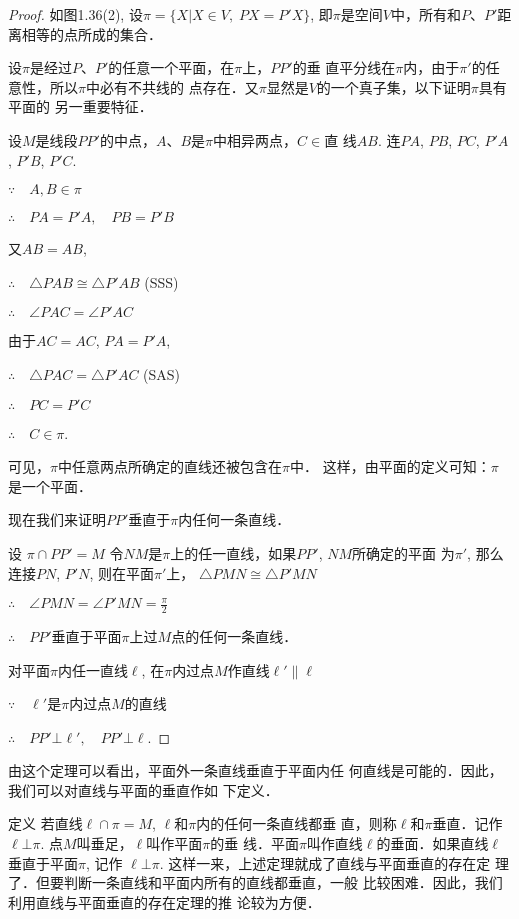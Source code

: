 \begin{proof}
如图1.36(2), 设$\pi=\{X|X\in V,\; PX=P'X\}$, 
即$\pi$是空间$V$中，所有和$P$、$P'$距离相等的点所成的集合．

设$\pi$是经过$P$、$P'$的任意一个平面，在$\pi$上，$PP'$的垂
直平分线在$\pi$内，由于$\pi'$的任意性，所以$\pi$中必有不共线的
点存在．又$\pi$显然是$V$的一个真子集，以下证明$\pi$具有平面的
另一重要特征．

设$M$是线段$PP'$的中点，$A$、$B$是$\pi$中相异两点，$C\in$直
线$AB$. 连$PA$, $PB$, $PC$, $P'A$, $P'B$, $P'C$.

$\because\quad A,B\in\pi$

$\therefore\quad PA=P'A,\quad PB=P'B$

又$AB=AB$,

$\therefore\quad \triangle PAB\cong \triangle P'AB$ (SSS)

$\therefore\quad \angle PAC=\angle P'AC$

由于$AC=AC$, $PA=P'A$,

$\therefore\quad \triangle PAC=\triangle P'AC$ (SAS)

$\therefore\quad PC=P'C$

$\therefore\quad C\in\pi$.

可见，$\pi$中任意两点所确定的直线还被包含在$\pi$中．
这样，由平面的定义可知：$\pi$是一个平面．

现在我们来证明$PP'$垂直于$\pi$内任何一条直线．

设 $\pi\cap PP'=M$
令$NM$是$\pi$上的任一直线，如果$PP'$, $NM$所确定的平面
为$\pi'$, 那么连接$PN$, $P'N$, 则在平面$\pi'$上，
$\triangle PMN\cong \triangle P'MN$

$\therefore\quad \angle PMN=\angle P'MN=\frac{\pi}{2}$

$\therefore\quad PP'$垂直于平面$\pi$上过$M$点的任何一条直线．

对平面$\pi$内任一直线$\ell$, 在$\pi$内过点$M$作直线$\ell'\parallel \ell$

$\because\quad \ell'$是$\pi$内过点$M$的直线

$\therefore\quad PP'\bot \ell',\quad PP'\bot \ell$.
\end{proof}

由这个定理可以看出，平面外一条直线垂直于平面内任
何直线是可能的．因此，我们可以对直线与平面的垂直作如
下定义．

\begin{blk}
  {定义} 若直线$\ell\cap \pi=M$, $\ell$和$\pi$内的任何一条直线都垂
直，则称$\ell$和$\pi$垂直．记作$\ell\bot \pi$. 点$M$叫垂足，$\ell$叫作平面$\pi$的垂
线．平面$\pi$叫作直线$\ell$的垂面．如果直线$\ell$垂直于平面$\pi$, 记作
$\ell\bot \pi$. 这样一来，上述定理就成了直线与平面垂直的存在定
理了．但要判断一条直线和平面内所有的直线都垂直，一般
比较困难．因此，我们利用直线与平面垂直的存在定理的推
论较为方便．
\end{blk}

